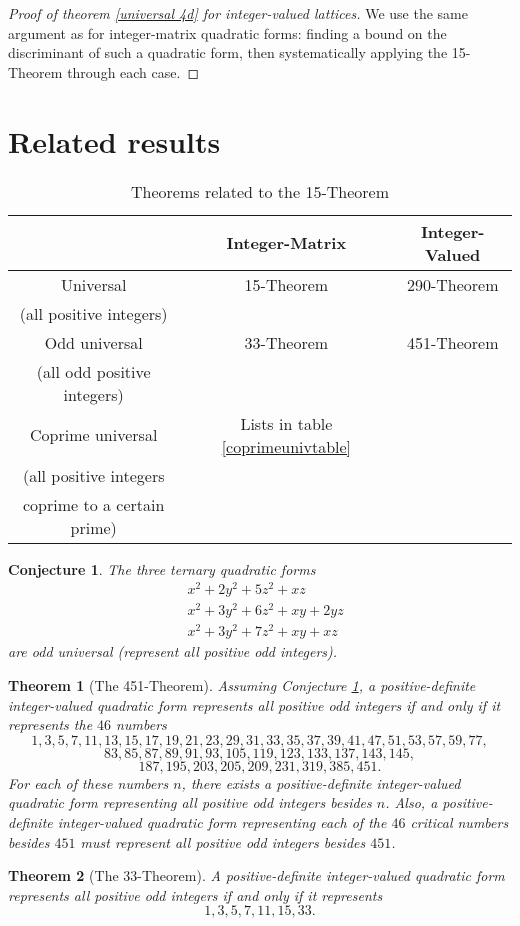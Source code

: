 \documentclass[letterpaper, 12pt]{article}
\newtheorem{thm}{Theorem}
\newtheorem{conj}{Conjecture}
\begin{document}
\begin{proof}[Proof of theorem \ref{universal 4d} for integer-valued lattices]
    We use the same argument as for integer-matrix quadratic forms: finding a bound on the discriminant of such a quadratic form, then systematically applying the 15-Theorem through each case.
\end{proof}

\section{Related results}

\begin{table}[H]
    \begin{tabular}{|c|c|c|}
        \hline
        & Integer-Matrix & Integer-Valued \\ \hline
        Universal & 15-Theorem & 290-Theorem \\
        (all positive integers) && \\ \hline
        Odd universal & 33-Theorem & 451-Theorem \\
        (all odd positive integers) && \\ \hline
        Coprime universal & Lists in table \ref{coprimeunivtable} & \\
        (all positive integers && \\
        coprime to a certain prime) && \\ \hline
    \end{tabular}
    \caption{Theorems related to the 15-Theorem}
\end{table}
\begin{conj}\label{451thmconj}
    The three ternary quadratic forms
    \begin{align*}
        & x^2 + 2y^2 + 5z^2 + xz \\
        & x^2 + 3y^2 + 6z^2 + xy + 2yz \\
        & x^2 + 3y^2 + 7z^2 + xy + xz
    \end{align*}
    are odd universal (represent all positive odd integers).
\end{conj}
\begin{thm}[The 451-Theorem]
    Assuming Conjecture \ref{451thmconj}, a positive-definite integer-valued quadratic form represents all positive \emph{odd} integers if and only if it represents the $46$ numbers
    \[1, 3, 5, 7, 11, 13, 15, 17, 19, 21, 23, 29, 31, 33, 35, 37, 39, 41, 47, 51, 53, 57, 59, 77,\]
    \[83, 85, 87, 89, 91, 93, 105, 119, 123, 133, 137, 143, 145,\]
    \[187, 195, 203, 205, 209, 231, 319, 385, 451.\]
    For each of these numbers $n$, there exists a positive-definite integer-valued quadratic form representing all positive odd integers besides $n$. Also, a positive-definite integer-valued quadratic form representing each of the $46$ critical numbers besides $451$ must represent all positive odd integers besides $451$.
\end{thm}
\begin{thm}[The 33-Theorem]
    A positive-definite integer-valued quadratic form represents all positive odd integers if and only if it represents
    \[1, 3, 5, 7, 11, 15, 33.\]
\end{thm}
\end{document}
